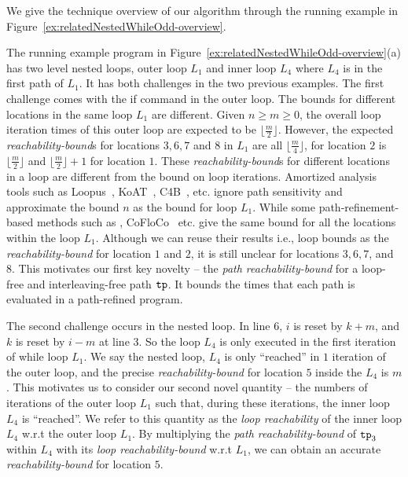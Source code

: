 We give the technique overview of our algorithm through the running example in Figure~\ref{ex:relatedNestedWhileOdd-overview}.

The running example program in Figure~\ref{ex:relatedNestedWhileOdd-overview}(a) has two level nested loops, outer loop $L_1$ and inner loop $L_4$ where $L_4$ is in the first path of $L_1$.
It has both challenges in the two previous examples.
The first challenge comes with the if command in the outer loop.
The bounds for different locations in the same loop $L_1$ are different.
Given $n \geq m \geq 0$,
the overall loop iteration times of this outer loop are expected to be $\lfloor\frac{m}{2}\rfloor$.
However, the expected \emph{reachability-bound}s for locations $3, 6, 7$ and $8$ in $L_1$ are all $\lfloor\frac{m}{4}\rfloor$,
for location $2$ is $\lfloor\frac{m}{2}\rfloor$ and $\lfloor\frac{m}{2}\rfloor + 1$ for location $1$.
These \emph{reachability-bound}s for different locations in a loop are different from the bound on loop iterations.
Amortized analysis tools such as Loopus~\cite{SinnZV17}, KoAT~\cite{BrockschmidtEFFG14,FalkeKS12,FalkeKS11}, C4B~\cite{CarbonneauxHS15}, etc. ignore path sensitivity and approximate the bound $n$ as the bound for loop $L_1$. 
While some path-refinement-based methods such as \cite{GulwaniZ10,GulwaniJK09}, CoFloCo~\cite{Montoya17,Flores-Montoya16,Flores-MontoyaH14} etc. give the same bound for all the locations within the loop $L_1$. 
Although we can reuse their results i.e., loop bounds as the \emph{reachability-bound} for location $1$ and $2$,
it is still unclear for locations $3, 6, 7$, and $8$.
%
This motivates our first key novelty -- the \emph{path reachability-bound}
for a loop-free and interleaving-free path $\mathtt{tp}$.
It bounds the times that each path is evaluated in a path-refined program.


The second challenge occurs in the nested loop.
In line 6, $i$ is reset by $k + m$, and $k$ is reset by $i - m$ at line 3. So the
loop $L_4$ is only executed in the first iteration of while loop $L_1$.
We say the nested loop, $L_4$ is only ``reached'' in $1$ iteration of the outer loop,
and the precise \emph{reachability-bound} for location $5$ inside the $L_4$ is $m$.
This motivates us to consider our second novel quantity --
the numbers of iterations of the {outer loop $L_1$} such that,
during these iterations, the inner loop $L_4$ is ``reached''.
We refer to this quantity as the \emph{loop reachability} of the inner loop $L_4$ w.r.t the outer loop $L_1$.
By multiplying the \emph{path reachability-bound} of $\mathtt{tp}_3$ within $L_4$
with its \emph{loop reachability-bound} w.r.t $L_1$, we can obtain an accurate
\emph{reachability-bound} for location $5$.

